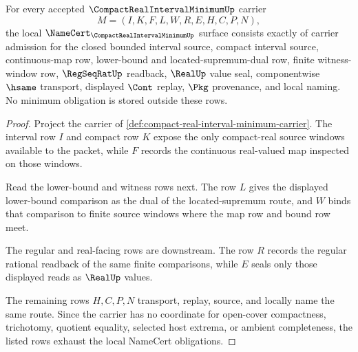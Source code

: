 \begin{theorem}
\label{thm:compact-real-interval-minimum-namecert-obligations}
For every accepted $\CompactRealIntervalMinimumUp$ carrier
$$
M=(I,K,F,L,W,R,E,H,C,P,N),
$$
the local $\NameCert_{\CompactRealIntervalMinimumUp}$ surface consists exactly of carrier admission for the closed bounded interval source, compact interval source, continuous-map row, lower-bound and located-supremum-dual row, finite witness-window row, $\RegSeqRatUp$ readback, $\RealUp$ value seal, componentwise $\hsame$ transport, displayed $\Cont$ replay, $\Pkg$ provenance, and local naming. No minimum obligation is stored outside these rows.
\end{theorem}
\begin{proof}
Project the carrier of \autoref{def:compact-real-interval-minimum-carrier}. The interval row $I$ and compact row $K$ expose the only compact-real source windows available to the packet, while $F$ records the continuous real-valued map inspected on those windows.

Read the lower-bound and witness rows next. The row $L$ gives the displayed lower-bound comparison as the dual of the located-supremum route, and $W$ binds that comparison to finite source windows where the map row and bound row meet.

The regular and real-facing rows are downstream. The row $R$ records the regular rational readback of the same finite comparisons, while $E$ seals only those displayed reads as $\RealUp$ values.

The remaining rows $H,C,P,N$ transport, replay, source, and locally name the same route. Since the carrier has no coordinate for open-cover compactness, trichotomy, quotient equality, selected host extrema, or ambient completeness, the listed rows exhaust the local NameCert obligations.
\end{proof}

